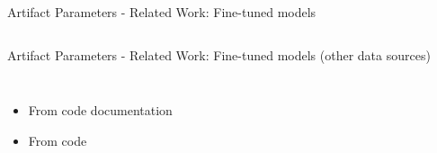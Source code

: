 \documentclass[en,16:9,smallfoot]{sdqbeamer}
\begin{document}
\begin{frame}{Artifact Parameters - Related Work: Fine-tuned models}
\begin{columns}
   \end{columns}
   \end{frame}

   \begin{frame}{Artifact Parameters - Related Work: Fine-tuned models (other data sources)}
   \begin{columns}
           \begin{itemize}
               \item From code documentation~\cite{Baudart2020}
               \item From code~\cite{RakAmnouykit2021}
           \end{itemize}
           \ 
   \end{columns}
   \end{frame}
\end{document}
